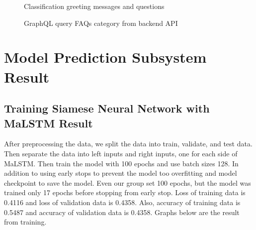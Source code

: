 \documentclass[12pt,oneside,openright,a4paper]{cpe-english-project}
\begin{document}
\begin{figure}[!h]\centering
\setlength{\fboxrule}{0.2mm} %
\setlength{\fboxsep}{1cm}
\caption{Classification greeting messages and questions}\label{fig:Classification greeting messages and questions}
\end{figure}
\begin{figure}[!h]\centering
\setlength{\fboxrule}{0.2mm} %
\setlength{\fboxsep}{1cm}
\caption{GraphQL query FAQs category from backend API}\label{fig:GraphQL query FAQs category from backend API}
\end{figure}

\section{Model Prediction Subsystem Result}
\subsection{Training Siamese Neural Network with MaLSTM Result}
After preprocessing the data, we split the data into train, validate, and test data. Then separate the data into left inputs and right inputs, one for each side of MaLSTM. Then train the model with 100 epochs and use batch sizes 128. In addition to using early stops to prevent the model too overfitting and model checkpoint to save the model. Even our group set 100 epochs, but the model was trained only 17 epochs before stopping from early stop. Loss of training data is 0.4116 and loss of validation data is 0.4358. Also, accuracy of training data is 0.5487 and accuracy of validation data is 0.4358. Graphs below are the result from training.
\end{document}
